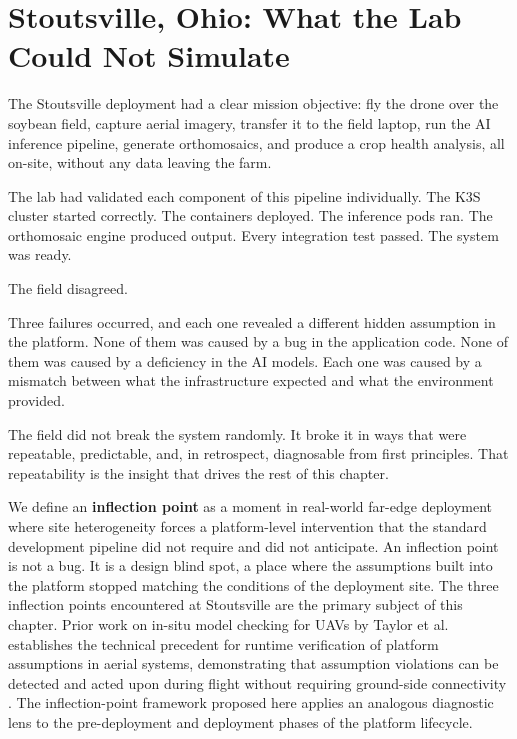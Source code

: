 \section{Stoutsville, Ohio: What the Lab Could Not Simulate}
\label{sec:ch3_stoutsville}
The Stoutsville deployment had a clear mission objective: fly the drone over the soybean field, capture aerial imagery, transfer it to the field laptop, run the AI inference pipeline, generate orthomosaics, and produce a crop health analysis, all on-site, without any data leaving the farm.

The lab had validated each component of this pipeline individually. The K3S cluster started correctly. The containers deployed. The inference pods ran. The orthomosaic engine produced output. Every integration test passed. The system was ready.

The field disagreed.

Three failures occurred, and each one revealed a different hidden assumption in the platform. None of them was caused by a bug in the application code. None of them was caused by a deficiency in the AI models. Each one was caused by a mismatch between what the infrastructure expected and what the environment provided.

The field did not break the system randomly. It broke it in ways that were repeatable, predictable, and, in retrospect, diagnosable from first principles. That repeatability is the insight that drives the rest of this chapter.

We define an \textbf{inflection point} as a moment in real-world far-edge deployment where site heterogeneity forces a platform-level intervention that the standard development pipeline did not require and did not anticipate. An inflection point is not a bug. It is a design blind spot, a place where the assumptions built into the platform stopped matching the conditions of the deployment site. The three inflection points encountered at Stoutsville are the primary subject of this chapter. Prior work on in-situ model checking for UAVs by Taylor et al. establishes the technical precedent for runtime verification of platform assumptions in aerial systems, demonstrating that assumption violations can be detected and acted upon during flight without requiring ground-side connectivity \cite{taylor2021avis}. The inflection-point framework proposed here applies an analogous diagnostic lens to the pre-deployment and deployment phases of the platform lifecycle.

